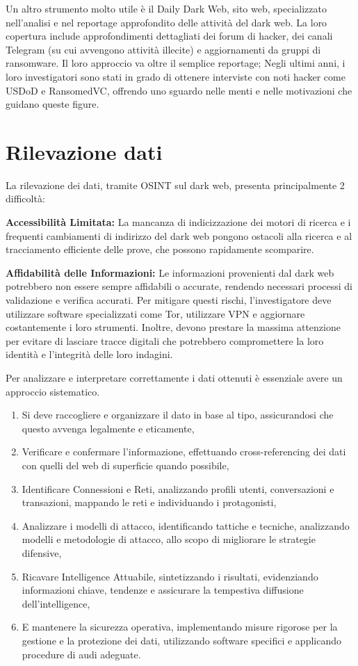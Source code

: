 Un altro strumento molto utile è il Daily Dark Web, sito web, specializzato nell'analisi e nel reportage approfondito delle attività del dark web. La loro copertura include approfondimenti dettagliati dei forum di hacker, dei canali Telegram (su cui avvengono attività illecite) e aggiornamenti da gruppi di ransomware. Il loro approccio va oltre il semplice reportage; Negli ultimi anni, i loro investigatori sono stati in grado di ottenere interviste con noti hacker come USDoD e RansomedVC, offrendo uno sguardo nelle menti e nelle motivazioni che guidano queste figure.


\section{Rilevazione dati}\label{sec:cap_sec_impl2}

La rilevazione dei dati, tramite OSINT sul dark web, presenta principalmente 2 difficoltà:

\textbf{Accessibilità Limitata:} La mancanza di indicizzazione dei motori di ricerca e i frequenti cambiamenti di indirizzo del dark web pongono ostacoli alla ricerca e al tracciamento efficiente delle prove, che possono rapidamente scomparire.

\textbf{Affidabilità delle Informazioni:} Le informazioni provenienti dal dark web potrebbero non essere sempre affidabili o accurate, rendendo necessari processi di validazione e verifica accurati. Per mitigare questi rischi, l'investigatore deve utilizzare software specializzati come Tor, utilizzare VPN e aggiornare costantemente i loro strumenti. Inoltre, devono prestare la massima attenzione per evitare di lasciare tracce digitali che potrebbero compromettere la loro identità e l'integrità delle loro indagini.


Per analizzare e interpretare correttamente i dati ottenuti è essenziale avere un approccio sistematico.

\begin{enumerate}
    \item Si deve raccogliere e organizzare il dato in base al tipo, assicurandosi che questo avvenga legalmente e eticamente,
    \item  Verificare e confermare l'informazione, effettuando cross-referencing dei dati con quelli del web di superficie quando possibile,
    \item Identificare Connessioni e Reti, analizzando profili utenti, conversazioni e transazioni, mappando le reti e individuando i protagonisti,
    \item Analizzare i modelli di attacco, identificando tattiche e tecniche, analizzando modelli e metodologie di attacco, allo scopo di migliorare le strategie difensive,
    \item Ricavare Intelligence Attuabile, sintetizzando i risultati, evidenziando informazioni chiave, tendenze e assicurare la tempestiva diffusione dell'intelligence,
    \item E mantenere la sicurezza operativa, implementando misure rigorose per la gestione e la protezione dei dati, utilizzando software specifici e applicando procedure di audi adeguate.
\end{enumerate}


